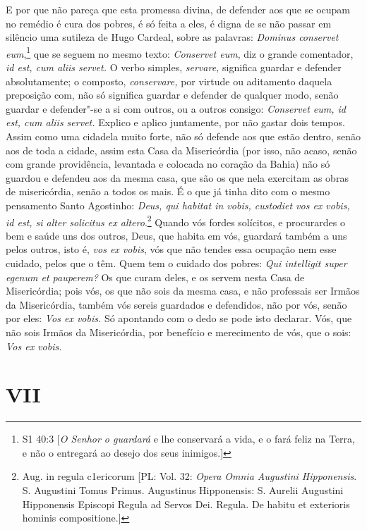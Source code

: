E por que não pareça que esta promessa divina, de defender aos que se
ocupam no remédio é cura dos pobres, é só feita a eles, é digna de se
não passar em silêncio uma sutileza de Hugo Cardeal, sobre as palavras:
\emph{Dominus conservet eum},\footnote{S1 40:3 [\textit{O Senhor o guardará} e lhe conservará a vida, e o fará feliz na Terra, e não o entregará ao desejo dos seus inimigos.]} que se seguem no mesmo texto:
\emph{Conservet eum}, diz o grande comentador, \emph{id est, cum aliis
servet.} O verbo simples, \emph{servare,} significa guardar e defender
absolutamente; o composto, \emph{conservare,} por virtude ou aditamento
daquela preposição com, não só significa guardar e defender de qualquer
modo, senão guardar e defender"-se a si com outros, ou a outros consigo:
\emph{Conservet eum, id est, cum aliis servet.} Explico e aplico
juntamente, por não gastar dois tempos. Assim como uma cidadela muito
forte, não só defende aos que estão dentro, senão aos de toda a cidade,
assim esta Casa da Misericórdia (por isso, não acaso, senão com grande
providência, levantada e colocada no coração da Bahia) não só guardou e
defendeu aos da mesma casa, que são os que nela exercitam as obras de
misericórdia, senão a todos os mais. É o que já tinha dito com o mesmo
pensamento Santo Agostinho: \emph{Deus, qui habitat in vobis, custodiet
vos ex vobis, id est, si alter solicitus ex altero}.\footnote{Aug. in regula c1ericorum [PL: Vol. 32: \textit{Opera Omnia Augustini Hipponensis}. S. Augustini Tomus Primus. Augustinus Hipponensis: S. Aurelii Augustini Hipponensis Episcopi Regula ad Servos Dei. Regula. De habitu et exterioris hominis compositione.]} Quando vós
fordes solícitos, e procurardes o bem e saúde uns dos outros, Deus, que
habita em vós, guardará também a uns pelos outros, isto é, \emph{vos ex
vobis}, vós que não tendes essa ocupação nem esse cuidado, pelos que o
têm.
Quem tem o cuidado dos pobres: \emph{Qui intelligit super egenum et
pauperem?} Os que curam deles, e os servem nesta Casa de Misericórdia; pois vós, os
que não sois da mesma casa, e não professais ser Irmãos da Misericórdia,
também vós sereis guardados e defendidos, não por vós, senão por eles:
\emph{Vos ex vobis.} Só apontando com o dedo se pode isto declarar.
Vós, que não sois Irmãos da Misericórdia, por benefício e merecimento de
vós, que o sois: \emph{Vos ex vobis.}

\section*{VII}

